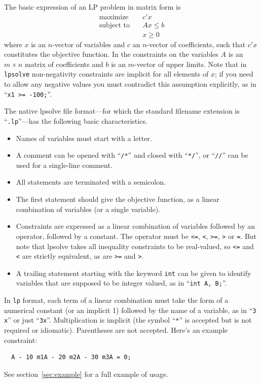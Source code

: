 \documentclass{article}
\begin{document}
The basic expression of an LP problem in matrix form is
\begin{align*}
  \mbox{maximize} & \quad c'x \\
  \mbox{subject to} & \quad Ax \leq b \\
  & \quad x \geq 0
\end{align*}
where $x$ is an $n$-vector of variables and $c$ an $n$-vector of
coefficients, such that $c'x$ constitutes the objective function. In
the constraints on the variables $A$ is an $m\times n$ matrix of
coefficients and $b$ is an $m$-vector of upper limits. Note that in
\texttt{lpsolve} non-negativity constraints are implicit for all
elements of $x$; if you need to allow any negative values you must
contradict this assumption explicitly, as in ``\texttt{x1 >= -100;}''.

The native \textsf{lpsolve} file format---for which the standard
filename extension is ``\texttt{.lp}''---has the following
basic characteristics.
\begin{itemize}
\item Names of variables must start with a letter.
\item A comment can be opened with ``\texttt{/*}'' and closed with
  ``\texttt{*/}'', or ``\texttt{//}'' can be used for a single-line
  comment.
\item All statements are terminated with a semicolon.
\item The first statement should give the objective function, as a
  linear combination of variables (or a single variable).
\item Constraints are expressed as a linear combination of variables
  followed by an operator, followed by a constant.  The operator must
  be \texttt{<=}, \texttt{<}, \texttt{>=}, \texttt{>} or \texttt{=}.
  But note that \textsf{lpsolve} takes all inequality constraints to
  be real-valued, so \texttt{<=} and \texttt{<} are strictly
  equivalent, as are \texttt{>=} and \texttt{>}.
\item A trailing statement starting with the keyword \texttt{int} can
  be given to identify variables that are supposed to be integer
  valued, as in ``\texttt{int A, B;}''.
\end{itemize}

In \texttt{lp} format, each term of a linear combination must take the
form of a numerical constant (or an implicit 1) followed by the name
of a variable, as in ``\texttt{3 x}'' or just
``\texttt{3x}''. Multiplication is implicit (the symbol ``\texttt{*}''
is accepted but is not required or idiomatic). Parentheses are not
accepted. Here's an example constraint:
\begin{verbatim}
  A - 10 m1A - 20 m2A - 30 m3A = 0;
\end{verbatim}
See section~\ref{sec:example} for a full example of usage.
\end{document}
